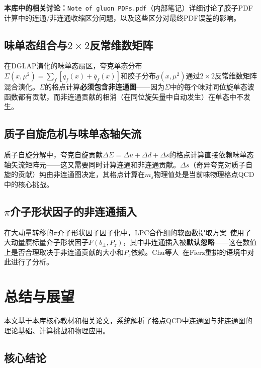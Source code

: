 \documentclass[12pt,a4paper]{ctexart}
\theoremstyle{definition}
\begin{document}
\textbf{本库中的相关讨论：}\texttt{Note of gluon PDFs.pdf}（内部笔记）详细讨论了胶子PDF计算中的连通/非连通收缩区分问题，以及这些区分对最终PDF误差的影响。

\subsection{味单态组合与$2\times2$反常维数矩阵}

在DGLAP演化的味单态扇区，夸克单态分布$\Sigma(x,\mu^2) = \sum_f[q_f(x) + \bar q_f(x)]$和胶子分布$g(x,\mu^2)$通过$2\times2$反常维数矩阵混合演化。$\Sigma$的格点计算\textbf{必须包含非连通图}——因为$\Sigma$中的每个味对同位旋单态波函数都有贡献，而非连通贡献的相消（在同位旋矢量中自动发生）在单态中不发生。

\subsection{质子自旋危机与味单态轴矢流}

质子自旋分解中，夸克自旋贡献$\Delta\Sigma = \Delta u + \Delta d + \Delta s$的格点计算直接依赖味单态轴矢流矩阵元——这又需要同时计算连通和非连通贡献。$\Delta s$（奇异夸克对质子自旋的贡献）纯由非连通图决定，其格点计算在$m_s$物理值处是当前味物理格点QCD中的核心挑战。

\subsection{$\pi$介子形状因子的非连通插入}

在大动量转移的$\pi$介子形状因子因子化中，LPC合作组的软函数提取方案~\cite{LPC2020soft}使用了大动量赝标量介子形状因子$F(b_\perp, P_z)$，其中非连通插入被\textbf{默认忽略}——这在数值上是否合理取决于非连通贡献的大小和$P_z$依赖。Chu等人~\cite{Chu2023soft}在Fierz重排的语境中对此进行了分析。

\section{总结与展望}

本文基于本库核心教材和相关论文，系统解析了格点QCD中连通图与非连通图的理论基础、计算挑战和物理应用。

\subsection*{核心结论}
\end{document}
